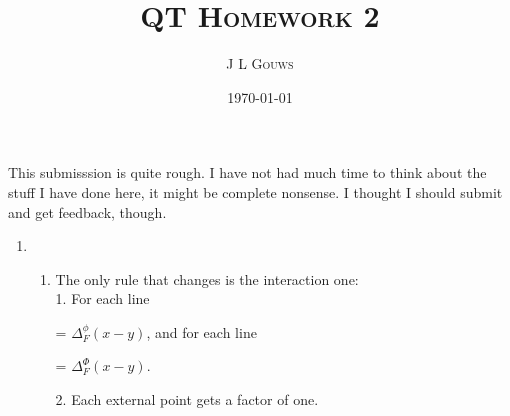 \documentclass[12pt,a4]{article}
\title{
\textsc{QT Homework 2}
}
\author{\textsc{J L Gouws}
}
\date{\today
\\[1cm]}
\begin{document}
\thispagestyle{empty}

\maketitle


This submisssion is quite rough. I have not had much time to think about the stuff I have done here, it might be complete nonsense.
I thought I should submit and get feedback, though.

\begin{enumerate}
  \item
    \begin{enumerate}
      \item 
        The only rule that changes is the interaction one:\\
        1. For each line
           = $\Delta^{\phi}_F(x - y)$, and
          for each line
           = $\Delta^{\Phi}_F(x - y)$.
          
        2. Each external point gets a factor of one.


\end{enumerate}
\end{enumerate}
\end{document}

